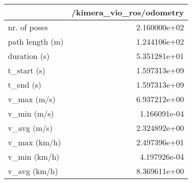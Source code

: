 \begin{tabular}{lr}
\toprule
{} &  /kimera\_vio\_ros/odometry \\
\midrule
nr. of poses    &              2.160000e+02 \\
path length (m) &              1.244106e+02 \\
duration (s)    &              5.351281e+01 \\
t\_start (s)     &              1.597313e+09 \\
t\_end (s)       &              1.597313e+09 \\
v\_max (m/s)     &              6.937212e+00 \\
v\_min (m/s)     &              1.166091e-04 \\
v\_avg (m/s)     &              2.324892e+00 \\
v\_max (km/h)    &              2.497396e+01 \\
v\_min (km/h)    &              4.197926e-04 \\
v\_avg (km/h)    &              8.369611e+00 \\
\bottomrule
\end{tabular}

